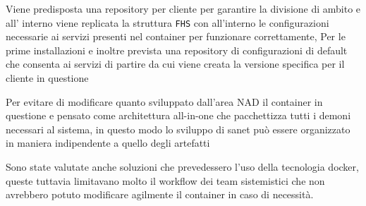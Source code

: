 Viene predisposta una repository per cliente per garantire la divisione di ambito e all' interno viene replicata la struttura \verb|FHS| con all'interno le configurazioni necessarie ai servizi presenti nel container per funzionare correttamente, Per le prime installazioni e inoltre prevista una repository di configurazioni di default che consenta ai servizi di partire da cui viene creata la versione specifica per il cliente in questione

Per evitare di modificare quanto sviluppato dall'area NAD il container in questione e pensato come architettura all-in-one che pacchettizza tutti i demoni necessari al sistema, in questo modo lo sviluppo di sanet può essere organizzato in maniera indipendente a quello degli artefatti

Sono state valutate anche soluzioni che prevedessero l'uso della tecnologia docker\cite{docker}, queste tuttavia limitavano molto il workflow dei team sistemistici che non avrebbero potuto modificare agilmente il container in caso di necessità.

%
%
